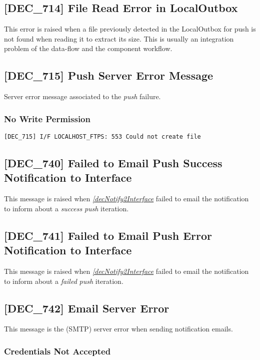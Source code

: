 \documentclass[dec_sum_main.tex]{subfiles}
\begin{document}
\label{DEC714}
\subsection{[DEC\_714] File Read Error in LocalOutbox}
This error is raised when a file previously detected in the LocalOutbox for push is not found when reading it to extract its size. This is usually an integration problem of the data-flow and the component workflow.

\label{DEC715}
\subsection{[DEC\_715] Push Server Error Message}
Server error message associated to the \textit{push} failure. 

\subsubsection{No Write Permission }
\begin{verbatim}
[DEC_715] I/F LOCALHOST_FTPS: 553 Could not create file
\end{verbatim}

\label{DEC740}
\subsection{[DEC\_740] Failed to Email Push Success Notification to Interface}
This message is raised when \hyperref[decNotify2Interface]{\textit{[decNotify2Interface}} failed to email the notification to inform about a \textit{success} \textit{push} iteration.

\label{DEC741}
\subsection{[DEC\_741] Failed to Email Push Error Notification to Interface}
This message is raised when \hyperref[decNotify2Interface]{\textit{[decNotify2Interface}} failed to email the notification to inform about a \textit{failed} \textit{push} iteration.

\label{DEC742}
\subsection{[DEC\_742] Email Server Error}
This message is the (SMTP) server error when sending notification emails.

\subsubsection{Credentials Not Accepted}
\end{document}
